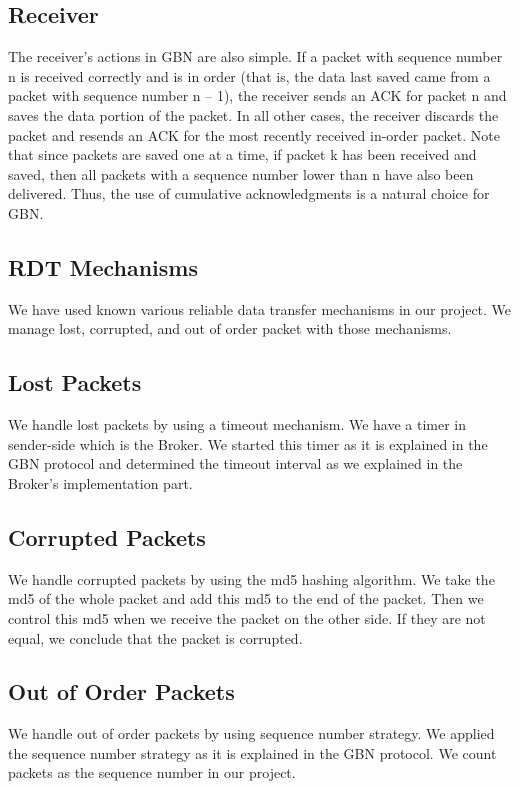 \documentclass[conference]{IEEEtran}
\begin{document}
\subsection*{Receiver}

The receiver’s actions in GBN are also simple. If a packet with sequence number n is received correctly and is in order (that is, the data last saved came from a packet with sequence number n – 1), the receiver sends an ACK for packet n and saves the data portion of the packet. In all other cases, the receiver discards the packet and resends an ACK for the most recently received in-order packet. Note that since packets are saved one at a time, if packet k has been received and saved, then all packets with a sequence number lower than n have also been delivered. Thus, the use of cumulative acknowledgments is a natural choice for GBN.


\subsection{RDT Mechanisms}

We have used known various reliable data transfer mechanisms in our project. We manage lost, corrupted, and out of order packet with those mechanisms.


\subsection*{Lost Packets}

We handle lost packets by using a timeout mechanism. We have a timer in sender-side which is the Broker. We started this timer as it is explained in the GBN protocol and determined the timeout interval as we explained in the Broker's implementation part.

\subsection*{Corrupted Packets}

We handle corrupted packets by using the md5 hashing algorithm. We take the md5 of the whole packet and add this md5 to the end of the packet. Then we control this md5 when we receive the packet on the other side. If they are not equal, we conclude that the packet is corrupted.

\subsection*{Out of Order Packets}
We handle out of order packets by using sequence number strategy. We applied the sequence number strategy as it is explained in the GBN protocol. We count packets as the sequence number in our project.
\end{document}
